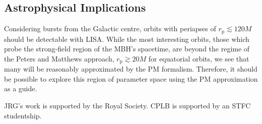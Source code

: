 \documentclass[aps,prd,reprint,showpacs,groupedaddress]{revtex4-1}
\newcommand{\sub}[1]{\ensuremath{_\text{#1}}}
\begin{document}
\subsection{Astrophysical Implications}

Considering bursts from the Galactic centre, orbits with periapses of $r\sub{p} \lesssim 120 M$ should be detectable with LISA\cite{Rubbo2006, Hopman2007}. While the most interesting orbits, those which probe the strong-field region of the MBH's spacetime, are beyond the regime of the Peters and Matthews approach, $r\sub{p} \gtrsim 20 M$ for equatorial orbits, we see that many will be reasonably approximated by the PM formalism. Therefore, it should be possible to explore this region of parameter space using the PM approximation as a guide.

\begin{acknowledgments}
JRG's work is supported by the Royal Society. CPLB is supported by an STFC studentship.
\end{acknowledgments}


\end{document}
